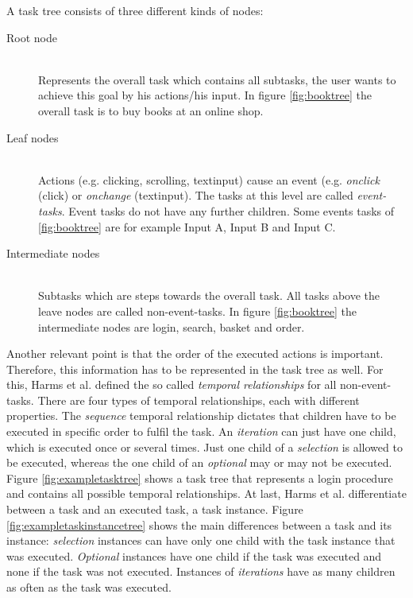 A task tree consists of three different kinds of nodes:
\begin{description}
	\item[Root node]\hfill\\ Represents the overall task which contains all subtasks, the user wants to achieve this goal by his actions/his input. In figure \ref{fig:booktree} the overall task is to buy books at an online shop.
	\item[Leaf nodes]\hfill\\ Actions (e.g. clicking, scrolling, textinput) cause an event (e.g. \textit{onclick} (click) or \textit{onchange} (textinput). The tasks at this level are called \textit{event-tasks}. Event tasks do not have any further children. Some events tasks of \ref{fig:booktree} are for example Input A, Input B and Input C.
	\item[Intermediate nodes]\hfill\\ Subtasks which are steps towards the overall task. All tasks above the leave nodes are called non-event-tasks. In figure \ref{fig:booktree} the intermediate nodes are login, search, basket and order.
\end{description}
Another relevant point is that the order of the executed actions is important.
Therefore, this information has to be represented in the task tree as well.
For this, Harms et al. defined the so called \textit{temporal relationships} for all non-event-tasks.
There are four types of temporal relationships, each with different properties.
The \textit{sequence} temporal relationship dictates that children have to be executed in specific order to fulfil the task.
An \textit{iteration} can just have one child, which is executed once or several times.
Just one child of a \textit{selection} is allowed to be executed, whereas the one child of an \textit{optional} may or may not be executed.
Figure \ref{fig:exampletasktree} shows a task tree that represents a login procedure and contains all possible temporal relationships.
At last, Harms et al. differentiate between a task and an executed task, a task instance.
Figure \ref{fig:exampletaskinstancetree} shows the main differences between a task and its instance: \textit{selection} instances can have only one child with the task instance that was executed. \textit{Optional} instances have one child if the task was executed and none if the task was not executed. Instances of \textit{iterations} have as many children as often as the task was executed.
